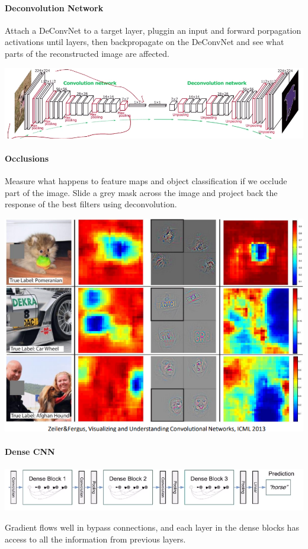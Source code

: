 \documentclass[10pt]{report}
\begin{document}
\paragraph{Deconvolution Network} Attach a DeConvNet to a target layer, pluggin an input and forward porpagation activations until layers, then backpropagate on the DeConvNet and see what parts of the reconstructed image are affected.
\begin{center}
	\includegraphics[scale=0.5]{68.png}
\end{center}
\paragraph{Occlusions} Measure what happens to feature maps and object classification if we occlude part of the image. Slide a grey mask across the image and project back the response of the best filters using deconvolution.\begin{center}
	\includegraphics[scale=0.5]{83.png}
\end{center}
\paragraph{Dense CNN}
\begin{center}
	\includegraphics[scale=0.5]{69.png}
\end{center}
Gradient flows well in bypass connections, and each layer in the dense blocks has access to all the information from previous layers.
\end{document}
